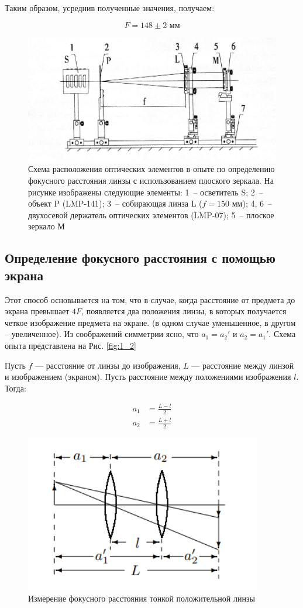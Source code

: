 \documentclass[a4paper, 12pt]{article}
\begin{document}
Таким образом, усреднив полученные значения, получаем:

\begin{equation*}
	F = 148 \pm 2 \text{ мм}
\end{equation*}


\begin{figure}[H]
	\centering
	\includegraphics[width=0.8\linewidth]{1}
	\caption{Схема расположения оптических элементов в опыте по определению фокусного расстояния линзы с использованием плоского зеркала. На рисунке изображены следующие элементы: 1~-- осветитель S; 2~-- объект P (LMP-141); 3~-- собирающая линза L ($f=150$ мм); 4, 6~-- двухосевой держатель оптических элементов (LMP-07); 5~-- плоское зеркало М}
	\label{fig:1_1}
\end{figure}

\subsection{Определение фокусного расстояния с помощью экрана}

Этот способ основывается на том, что в случае, когда расстояние от предмета до экрана превышает $4F$, появляется два положения линзы, в которых получается четкое изображение предмета на экране. (в одном случае уменьшенное, в другом -- увеличенное). Из соображений симметрии ясно, что $a_1=a_2'$ и $a_2=a_1'$. Схема опыта представлена на Рис. \ref{fig:1_2}

Пусть  $f$ --- расстояние от линзы до изображения, $L$ --- расстояние между линзой и изображением (экраном).  Пусть расстояние между положениями изображения $l$. Тогда:

\begin{align*}
	a_1 &= \frac{L - l}{2} \\
	a_2 &= \frac{L + l}{2}
\end{align*}

\begin{figure}[H]
	\centering
	\includegraphics[width=0.4\linewidth]{3}
	\caption{Измерение фокусного расстояния тонкой положительной линзы}
	\label{fig:1_3}
\end{figure}
\end{document}
